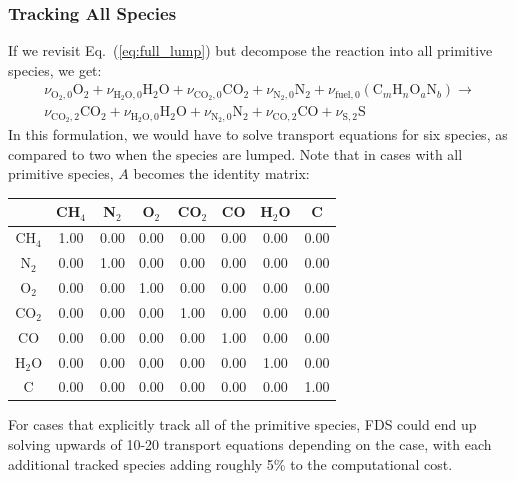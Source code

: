 \subsubsection{Tracking All Species}

If we revisit Eq.~(\ref{eq:full_lump}) but decompose the reaction into all primitive species, we get:
\begin{multline}\label{eq:prim}
\nu_{\mathrm{O}_{2},0}\mathrm{O}_2+\nu_{\mathrm{H}_{2}\mathrm{O},0}\mathrm{H}_2\mathrm{O}+\nu_{\mathrm{CO}_{2},0}\mathrm{CO}_2+\nu_{\mathrm{N}_{2},0}\mathrm{N}_2+\nu_{\mathrm{fuel},0}(\mbox{C}_m\mbox{H}_n\mbox{O}_a\mbox{N}_b) \longrightarrow \\
\nu_{\mathrm{CO}_{2},2}\mathrm{CO}_2+\nu_{\mathrm{H}_{2}\mathrm{O},0}\mathrm{H}_2\mathrm{O}+\nu_{\mathrm{N}_{2},0}\mathrm{N}_2+\nu_{\mathrm{CO},2}\mathrm{CO}+\nu_{\mathrm{S},2}\mathrm{S}
\end{multline}
In this formulation, we would have to solve transport equations for six species, as compared to two when the species are lumped. Note that in cases with all primitive species, $A$ becomes the identity matrix:

\begin{center}
\begin{tabular}{|c|c|c|c|c|c|c|c|}
\hline  & {CH$_4$} & {N$_2$} & {O$_2$} & {CO$_2$} & {CO} & {H$_2$O} & {C} \\ \hline \hline
{CH$_4$}            & 1.00 & 0.00 & 0.00 & 0.00 & 0.00 & 0.00 & 0.00 \\
{N$_2$}             & 0.00 & 1.00 & 0.00 & 0.00 & 0.00 & 0.00 & 0.00 \\
{O$_2$}             & 0.00 & 0.00 & 1.00 & 0.00 & 0.00 & 0.00 & 0.00 \\
{CO$_2$}            & 0.00 & 0.00 & 0.00 & 1.00 & 0.00 & 0.00 & 0.00 \\
{CO}                & 0.00 & 0.00 & 0.00 & 0.00 & 1.00 & 0.00 & 0.00 \\ 
{H$_2$O}            & 0.00 & 0.00 & 0.00 & 0.00 & 0.00 & 1.00 & 0.00 \\ 
{C}                 & 0.00 & 0.00 & 0.00 & 0.00 & 0.00 & 0.00 & 1.00 \\\hline
\end{tabular}
\end{center}
For cases that explicitly track all of the primitive species, FDS could end up solving upwards of 10-20 transport equations depending on the case, with each additional tracked species adding roughly 5\% to the computational cost.



